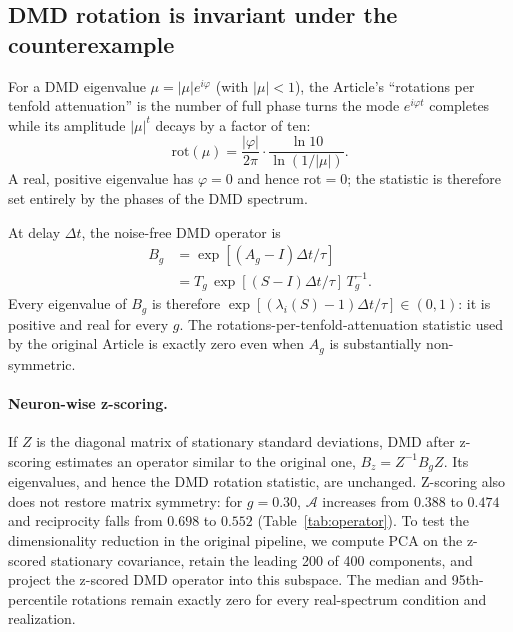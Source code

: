 \documentclass[11pt]{article}
\newcommand{\asym}{\mathcal{A}}
\begin{document}
\subsection{DMD rotation is invariant under the counterexample}
For a DMD eigenvalue $\mu=|\mu|e^{i\varphi}$ (with $|\mu|<1$), the Article's
``rotations per tenfold attenuation'' is the number of full phase turns the mode
$e^{i\varphi t}$ completes while its amplitude $|\mu|^t$ decays by a factor of
ten:
\begin{equation}
\mathrm{rot}(\mu)=\frac{|\varphi|}{2\pi}\cdot\frac{\ln 10}{\ln(1/|\mu|)} .
\label{eq:rot}
\end{equation}
A real, positive eigenvalue has $\varphi=0$ and hence $\mathrm{rot}=0$; the
statistic is therefore set entirely by the phases of the DMD spectrum.

At delay $\Delta t$, the noise-free DMD operator is
\begin{align}
  B_g
  &=\exp[(A_g-I)\Delta t/\tau]\\
  &=T_g\,\exp[(S-I)\Delta t/\tau]\,T_g^{-1}.
\end{align}
Every eigenvalue of $B_g$ is therefore
$\exp[(\lambda_i(S)-1)\Delta t/\tau]\in(0,1)$: it is positive and real for
every $g$. The rotations-per-tenfold-attenuation statistic used by the original
Article is exactly zero even when $A_g$ is substantially non-symmetric.

\paragraph{Neuron-wise z-scoring.}
If $Z$ is the diagonal matrix of stationary standard deviations, DMD after
z-scoring estimates an operator similar to the original one,
$B_z=Z^{-1}B_g Z$. Its eigenvalues, and hence the DMD rotation statistic, are
unchanged. Z-scoring also does not restore matrix symmetry: for $g=0.30$,
$\asym$ increases from $0.388$ to $0.474$ and reciprocity falls from $0.698$ to
$0.552$ (Table~\ref{tab:operator}). To test the dimensionality reduction in the
original pipeline, we compute PCA on the z-scored stationary covariance, retain
the leading 200 of 400 components, and project the z-scored DMD operator into
this subspace. The median and 95th-percentile rotations remain exactly zero for
every real-spectrum condition and realization.
\end{document}
